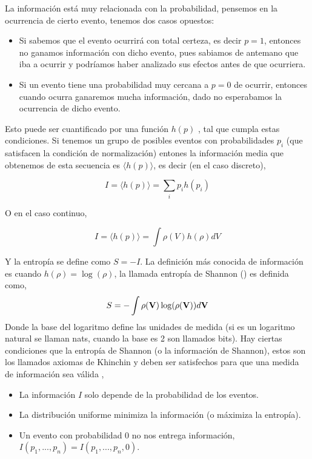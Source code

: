 \documentclass[executivepaper,12pt]{article}
\numberwithin{equation}{section}
\begin{document}
La información está muy relacionada con la probabilidad, pensemos en la ocurrencia de cierto evento, tenemos dos casos opuestos:

\begin{itemize}
	\item Si sabemos que el evento ocurrirá con total certeza, es decir $p=1$, entonces no ganamos información con dicho evento, pues sabiamos de antemano que iba a ocurrir y podríamos haber analizado sus efectos antes de que ocurriera. 
	\item Si un evento tiene una probabilidad muy cercana a $p=0$ de ocurrir, entonces cuando ocurra ganaremos mucha información, dado no esperabamos la ocurrencia de dicho evento. 
\end{itemize}

Esto puede ser cuantificado por una función $h(p)$ \parencite{beck2009}, tal que cumpla estas condiciones. Si tenemos un grupo de posibles eventos con probabilidades $p_i$ (que satisfacen la condición de normalización) entones la información media que obtenemos de esta secuencia es $\langle h(p) \rangle$, es decir (en el caso discreto),

\begin{equation*}
	I=\langle h(p) \rangle=\sum_i p_i h(p_i)
\end{equation*}

O en el caso continuo,

\begin{equation}
	I=\langle h(p) \rangle=\int \rho(V) h(\rho)dV
\end{equation}

Y la entropía se define como $S=-I$. La definición más conocida de información es cuando $h(\rho)=\log(\rho)$, la llamada entropía de Shannon (\parencite{shannon1948}) es definida como,
\begin{equation}
	S=-\int \rho(\vb{V})\log(\rho(\vb{V}))d\vb{V}
	\label{eq.shann}
\end{equation}
Donde la base del logaritmo define las unidades de medida (si es un logaritmo natural se llaman nats, cuando la base es 2 son llamados bits). Hay ciertas condiciones que la entropía de Shannon (o la información de Shannon), estos son los llamados axiomas de Khinchin y deben ser satisfechos para que una medida de información sea válida \parencite{khinchin2013},

\begin{itemize}
	\item La información $I$ solo depende de la probabilidad de los eventos.
	\item La distribución uniforme minimiza la información (o máximiza la entropía). 
	\item Un evento con probabilidad $0$ no nos entrega información, $I(p_1,...,p_n)=I(p_1,...,p_n,0)$. 
\end{itemize}
\end{document}
